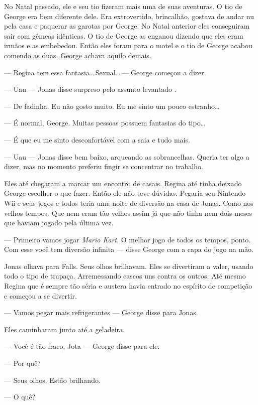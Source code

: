 No Natal passado, ele e seu tio fizeram mais uma de suas aventuras. O tio de George era bem diferente dele. Era extrovertido, brincalhão, gostava de andar nu pela casa e paquerar as garotas por George. No Natal anterior eles conseguiram sair com gêmeas idênticas. O tio de George as enganou dizendo que eles eram irmãos e as embebedou. Então eles foram para o motel e o tio de George acabou comendo as duas. George achava aquilo demais.

--- Regina tem essa fantasia\ldots\,Sexual\ldots\,--- George começou a dizer.

--- Uau --- Jonas disse\mudanca{,} surpreso pelo assunto levantado .

--- De fadinha. Eu não gosto muito. Eu me sinto um pouco estranho\ldots

--- É normal, George. Muitas pessoas possuem fantasias do tipo\ldots

--- É que eu me sinto desconfortável com a saia e tudo mais.

--- Uau --- Jonas disse bem baixo, arqueando as sobrancelhas. Queria ter algo a dizer, mas no momento preferiu fingir se concentrar no trabalho.

Eles até chegaram a marcar um encontro de casais. Regina até tinha deixado George escolher o que fazer. Então ele não teve dúvidas. Pegaria seu Nintendo Wii e seus jogos e todos teria uma noite de diversão na casa de Jonas. Como nos velhos tempos. Que nem eram tão velhos assim\mudanca{,} já que não tinha nem dois meses que haviam jogado pela última vez.

--- Primeiro vamos jogar \emph{Mario Kart}. O melhor jogo de todos os tempos, ponto. Com esse\mudanca{,} você tem diversão infinita --- disse George com a capa do jogo na mão.

Jonas olhava para Falls. Seus olhos brilhavam. Eles se divertiram a valer, usando todo o tipo de trapaça. Arremessando cascos uns contra os outros. Até mesmo Regina\mudanca{,} que é sempre tão séria e austera\mudanca{,} havia entrado no espírito de competição e começou a se divertir.

--- Vamos pegar mais refrigerantes --- George disse para Jonas.

Eles caminharam junto até a geladeira.

--- Você é tão fraco, Jota --- George disse para ele.

--- Por quê?

--- Seus olhos. Estão brilhando.

--- O quê?

